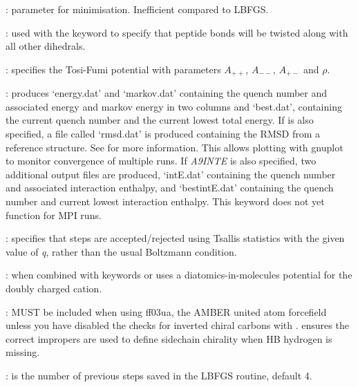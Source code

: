 {: parameter for {\/} minimisation. 
Inefficient compared to LBFGS.

: used with the {} keyword to specify that peptide bonds will be twisted along with all other dihedrals.


: specifies the Tosi-Fumi potential\cite{tosif64}
with parameters $A_{++}$, $A_{--}$, $A_{+-}$ and $\rho$.

: produces `energy.dat' and `markov.dat' containing the quench number and 
associated energy and markov energy in two columns and `best.dat', containing the current quench number and the current lowest
total energy. If {\/} is also specified, a file called `rmsd.dat' is produced containing the RMSD from a reference structure.
See {\/} for more information. This allows plotting with gnuplot to monitor convergence of multiple runs.
If {\it A9INTE} is also specified, two additional output files are produced, `intE.dat' containing the quench number and associated interaction
enthalpy, and `bestintE.dat' containing the quench number and current lowest interaction enthalpy. This keyword does not yet function for MPI runs.

: specifies that steps are accepted/rejected using Tsallis statistics with the
given value of {\it q\/}, rather than the usual Boltzmann condition.

: when combined with keywords {\/} or {\/}
uses a diatomics-in-molecules potential for the doubly charged cation.

: MUST be included when using ff03ua, the AMBER united atom forcefield unless you have disabled the checks for inverted chiral carbons
 with {\/}. {\/} ensures the correct impropers are used to define sidechain chirality when HB hydrogen is missing. 

: {\/} is the number of previous steps saved in the LBFGS routine,
default 4.

}

